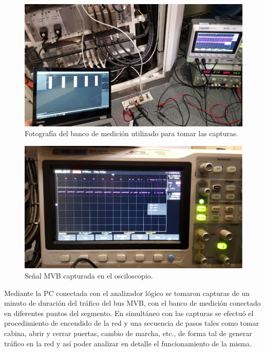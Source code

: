 \begin{figure}[htbp]
	\centering
	\includegraphics[width=\textwidth]{./Figures/foto-capturas.jpg}
	\caption{Fotografía del banco de medición utilizado para tomar las capturas.}
    \label{fig:foto-banco-capturas}
\end{figure}

\begin{figure}[htbp]
	\centering
	\includegraphics[width=\textwidth]{./Figures/osciloscopio.jpg}
	\caption{Señal MVB capturada en el osciloscopio.}
    \label{fig:osciloscopio}
\end{figure}

Mediante la PC conectada con el analizador lógico se tomaron capturas de un minuto de duración del tráfico del bus MVB, con el banco de medición conectado en diferentes puntos del segmento.
En simultáneo con las capturas se efectuó el procedimiento de encendido de la red y una secuencia de pasos tales como tomar cabina, abrir y cerrar puertas, cambio de marcha, etc., de forma tal de generar tráfico en la red y así poder analizar en detalle el funcionamiento de la misma.

